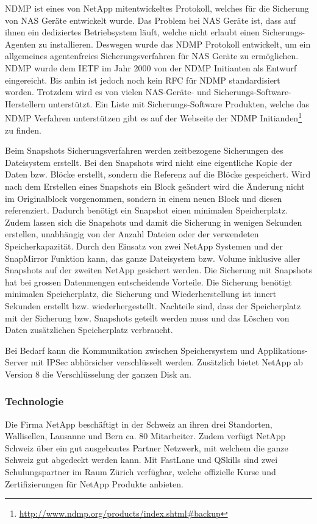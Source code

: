 NDMP ist eines von NetApp mitentwickeltes Protokoll, welches für die Sicherung von NAS Geräte entwickelt wurde. Das Problem bei NAS Geräte ist, dass auf ihnen ein dediziertes Betriebsystem läuft, welche nicht erlaubt einen Sicherungs-Agenten zu installieren. Deswegen wurde das NDMP Protokoll entwickelt, um ein allgemeines agentenfreies Sicherungsverfahren für NAS Geräte zu ermöglichen. NDMP wurde dem IETF im Jahr 2000 von der NDMP Initianten als Entwurf eingereicht. Bis anhin ist jedoch noch kein RFC für NDMP standardisiert worden. Trotzdem wird es von vielen NAS-Geräte- und Sicherungs-Software- Herstellern unterstützt. Ein Liste mit Sicherungs-Software Produkten, welche das NDMP Verfahren unterstützen gibt es auf der Webseite der NDMP Initianden\footnote{\url{http://www.ndmp.org/products/index.shtml#backup}} zu finden. \cite{NDMP.orga}\cite{NDMP.org}

Beim Snapshots Sicherungsverfahren werden zeitbezogene Sicherungen des Dateisystem erstellt. Bei den Snapshots wird nicht eine eigentliche Kopie der Daten bzw. Blöcke erstellt, sondern die Referenz auf die Blöcke gespeichert. Wird nach dem Erstellen eines Snapshots ein Block geändert wird die Änderung nicht im Originalblock vorgenommen, sondern in einem neuen Block und diesen referenziert. Dadurch benötigt ein Snapshot einen minimalen Speicherplatz. Zudem lassen sich die Snapshots und damit die Sicherung in wenigen Sekunden erstellen, unabhängig von der Anzahl Dateien oder der verwendeten Speicherkapazität. Durch den Einsatz von zwei NetApp Systemen und der SnapMirror Funktion kann, das ganze Dateisystem bzw. Volume inklusive aller Snapshots auf der zweiten NetApp gesichert werden. Die Sicherung mit Snapshots hat bei grossen Datenmengen entscheidende Vorteile. Die Sicherung benötigt minimalen Speicherplatz, die Sicherung und Wiederherstellung ist innert Sekunden erstellt bzw. wiederhergestellt. Nachteile sind, dass der Speicherplatz mit der Sicherung bzw. Snapshots geteilt werden muss und das Löschen von Daten zusätzlichen Speicherplatz verbraucht.

Bei Bedarf kann die Kommunikation zwischen Speichersystem und Applikations-Server mit IPSec abhörsicher verschlüsselt werden. Zusätzlich bietet NetApp ab Version 8 die Verschlüsselung der ganzen Disk an.

\subsubsection*{Technologie}
Die Firma NetApp beschäftigt in der Schweiz an ihren drei Standorten, Wallisellen, Lausanne und Bern ca. 80 Mitarbeiter. Zudem verfügt NetApp Schweiz über ein gut ausgebautes Partner Netzwerk, mit welchem die ganze Schweiz gut abgedeckt werden kann. Mit FastLane und QSkills sind zwei Schulungspartner im Raum Zürich verfügbar, welche offizielle Kurse und Zertifizierungen für NetApp Produkte anbieten. 

